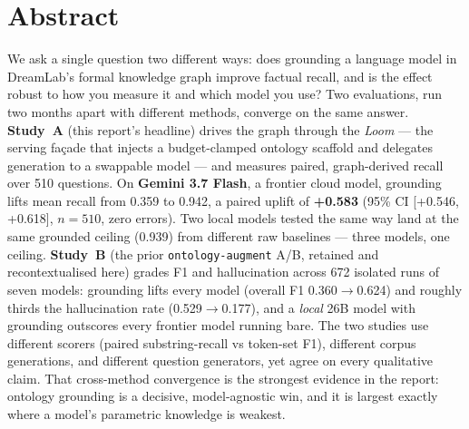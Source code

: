 \documentclass[11pt]{article}
\begin{document}
\section*{Abstract}
We ask a single question two different ways: does grounding a language model in DreamLab's
formal knowledge graph improve factual recall, and is the effect robust to how you measure it
and which model you use? Two evaluations, run two months apart with different methods, converge
on the same answer. \textbf{Study~A} (this report's headline) drives the graph through the
\emph{Loom} --- the serving façade that injects a budget-clamped ontology scaffold and delegates
generation to a swappable model --- and measures paired, graph-derived recall over 510 questions.
On \textbf{Gemini 3.7 Flash}, a frontier cloud model, grounding lifts mean recall from 0.359 to
0.942, a paired uplift of \textbf{+0.583} (95\% CI [+0.546, +0.618], $n=510$, zero errors).
Two local models tested the same way land at the same grounded ceiling (0.939) from different
raw baselines --- three models, one ceiling. \textbf{Study~B} (the prior \texttt{ontology-augment}
A/B, retained and recontextualised here) grades F1 and hallucination across 672 isolated runs of
seven models: grounding lifts every model (overall F1 0.360$\to$0.624) and roughly thirds the
hallucination rate (0.529$\to$0.177), and a \emph{local} 26B model with grounding outscores every
frontier model running bare. The two studies use different scorers (paired substring-recall vs
token-set F1), different corpus generations, and different question generators, yet agree on
every qualitative claim. That cross-method convergence is the strongest evidence in the report:
ontology grounding is a decisive, model-agnostic win, and it is largest exactly where a model's
parametric knowledge is weakest.

\end{document}
